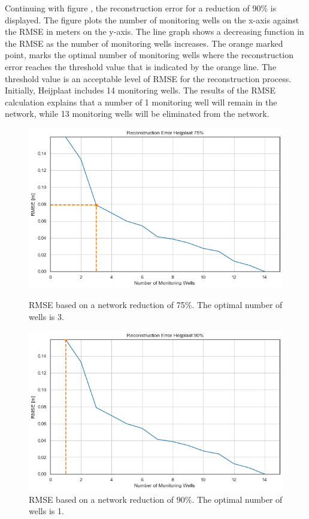 \newline
Continuing with figure , the reconstruction error for a reduction of 90\% is displayed. The figure plots the number of monitoring wells on the x-axis against the RMSE in meters on the y-axis. The line graph shows a decreasing function in the RMSE as the number of monitoring wells increases. The orange marked point, marks the optimal number of monitoring wells where the reconstruction error reaches the threshold value that is indicated by the orange line. The threshold value is an acceptable level of RMSE for the reconstruction process. Initially, Heijplaat includes 14 monitoring wells. The results of the RMSE calculation explains that a number of  1 monitoring well will remain in the network, while 13 monitoring wells will be eliminated from the network.

\begin{figure}[htbp]
    \centering
    \begin{minipage}{0.45\linewidth}
        \includegraphics[width=\linewidth]{frontmatter/Heijplaat-fig/new75.png}
        \caption{RMSE based on a network reduction of 75\%. The optimal number of wells is 3.}
        \label{heij75}
    \end{minipage}
    \hfill
    \begin{minipage}{0.45\linewidth}
        \includegraphics[width=\linewidth]{frontmatter/Heijplaat-fig/new90.png}
        \caption{RMSE based on a network reduction of 90\%. The optimal number of wells is 1.}
        \label{heij90}
    \end{minipage}
\end{figure}

